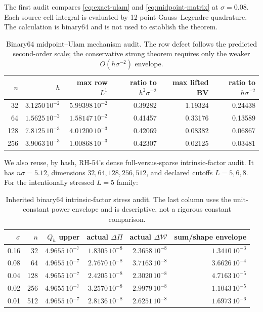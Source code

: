 \documentclass[11pt]{article}
\theoremstyle{remark}
\newcommand{\cW}{\mathcal W}
\begin{document}
The first audit compares \eqref{eq:exact-ulam} and
\eqref{eq:midpoint-matrix} at $\sigma=0.08$.  Each source-cell integral is
evaluated by 12-point Gauss--Legendre quadrature.  The calculation is
binary64 and is not used to establish the theorem.

\begin{table}[H]
\centering
\small
\begin{tabular}{@{}rrrrrr@{}}
\toprule
$n$&$h$&max row $L^1$&ratio to $h^2\sigma^{-2}$&max lifted BV&ratio to $h\sigma^{-2}$\\
\midrule
32 &$3.1250\,10^{-2}$&$5.99398\,10^{-2}$&0.39282&1.19324&0.24438\\
64 &$1.5625\,10^{-2}$&$1.58147\,10^{-2}$&0.41457&0.33176&0.13589\\
128&$7.8125\,10^{-3}$&$4.01200\,10^{-3}$&0.42069&0.08382&0.06867\\
256&$3.9063\,10^{-3}$&$1.00868\,10^{-3}$&0.42307&0.02125&0.03481\\
\bottomrule
\end{tabular}
\caption{Binary64 midpoint--Ulam mechanism audit.  The row defect follows
the predicted second-order scale; the conservative strong theorem requires
only the weaker $O(h\sigma^{-2})$ envelope.}
\label{tab:midpoint-ulam}
\end{table}

We also reuse, by hash, RH-54's dense full-versus-sparse intrinsic-factor
audit.  It has $n\sigma=5.12$, dimensions $32,64,128,256,512$, and declared
cutoffs $L=5,6,8$.  For the intentionally stressed $L=5$ family:

\begin{table}[H]
\centering
\small
\begin{tabular}{@{}rrrrrr@{}}
\toprule
$\sigma$&$n$&$Q_h$ upper&actual $\Delta\Pi$&actual $\Delta\cW$&sum/shape envelope\\
\midrule
0.16&32 &$4.9655\,10^{-7}$&$1.8305\,10^{-8}$&$2.3658\,10^{-8}$&$1.3410\,10^{-3}$\\
0.08&64 &$4.9655\,10^{-7}$&$2.7670\,10^{-8}$&$3.7163\,10^{-8}$&$3.6626\,10^{-4}$\\
0.04&128&$4.9655\,10^{-7}$&$2.4205\,10^{-8}$&$2.3020\,10^{-8}$&$4.7163\,10^{-5}$\\
0.02&256&$4.9655\,10^{-7}$&$3.2570\,10^{-8}$&$2.9979\,10^{-8}$&$1.1043\,10^{-5}$\\
0.01&512&$4.9655\,10^{-7}$&$2.8136\,10^{-8}$&$2.6251\,10^{-8}$&$1.6973\,10^{-6}$\\
\bottomrule
\end{tabular}
\caption{Inherited binary64 intrinsic-factor stress audit.  The last column
uses the unit-constant power envelope and is descriptive, not a rigorous
constant comparison.}
\label{tab:factor-audit}
\end{table}
\end{document}

